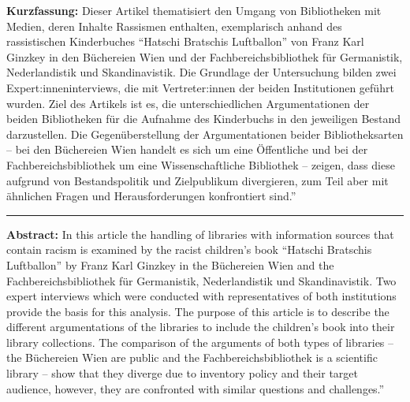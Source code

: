\textbf{Kurzfassung:} Dieser Artikel thematisiert den Umgang von Bibliotheken mit
Medien, deren Inhalte Rassismen enthalten, exemplarisch anhand des
rassistischen Kinderbuches \enquote{Hatschi Bratschis Luftballon} von Franz
Karl Ginzkey in den Büchereien Wien und der Fachbereichsbibliothek für
Germanistik, Nederlandistik und Skandinavistik. Die Grundlage der
Untersuchung bilden zwei Expert:inneninterviews, die mit Vertreter:innen
der beiden Institutionen geführt wurden. Ziel des Artikels ist es, die
unterschiedlichen Argumentationen der beiden Bibliotheken für die
Aufnahme des Kinderbuchs in den jeweiligen Bestand darzustellen. Die
Gegenüberstellung der Argumentationen beider Bibliotheksarten -- bei den
Büchereien Wien handelt es sich um eine Öffentliche und bei der
Fachbereichsbibliothek um eine Wissenschaftliche Bibliothek -- zeigen,
dass diese aufgrund von Bestandspolitik und Zielpublikum divergieren,
zum Teil aber mit ähnlichen Fragen und Herausforderungen konfrontiert
sind.''

\begin{center}\rule{0.5\linewidth}{0.5pt}\end{center}

\noindent \textbf{Abstract:}  In this article the handling of libraries with information
sources that contain racism is examined by the racist children's book
\enquote{Hatschi Bratschis Luftballon} by Franz Karl Ginzkey in the Büchereien
Wien and the Fachbereichsbibliothek für Germanistik, Nederlandistik und
Skandinavistik. Two expert interviews which were conducted with
representatives of both institutions provide the basis for this
analysis. The purpose of this article is to describe the different
argumentations of the libraries to include the children's book into
their library collections. The comparison of the arguments of both types
of libraries -- the Büchereien Wien are public and the
Fachbereichsbibliothek is a scientific library -- show that they diverge
due to inventory policy and their target audience, however, they are
confronted with similar questions and challenges.''
